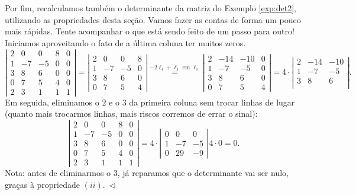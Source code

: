 \begin{ex}
Por fim, recalculamos também o determinante da matriz do Exemplo \ref{exp:det2}, utilizando as propriedades desta seção. Vamos fazer as contas de forma um pouco mais rápidas. Tente acompanhar o que está sendo feito de um passo para outro! Iniciamos aproveitando o fato de a última coluna ter muitos zeros.
\begin{equation}
\left|
\begin{matrix}
2 & 0 & 0 & 8 & 0 \\
1 & -7 & -5 & 0 & 0 \\
3 & 8 & 6 & 0 & 0 \\
0 & 7 & 5 & 4 & 0 \\
2 & 3 & 1 & 1 & 1
\end{matrix}
\right| =
\left|
\begin{matrix}
2 & 0 & 0 & 8 \\
1 & -7 & -5 & 0  \\
3 & 8 & 6 & 0  \\
0 & 7 & 5 & 4
\end{matrix}
\right| \stackrel{-2\ell_4 + \ell_1 \text{ em } \ell_1}{=}
\left|
\begin{matrix}
2 & -14 & -10 & 0 \\
1 & -7 & -5 & 0  \\
3 & 8 & 6 & 0  \\
0 & 7 & 5 & 4
\end{matrix}
\right| =  4 \cdot
\left|
\begin{matrix}
2 & -14 & -10  \\
1 & -7 & -5  \\
3 & 8 & 6   \\
\end{matrix}
\right|.
\end{equation} Em seguida, eliminamos o $2$ e o $3$ da primeira coluna sem trocar linhas de lugar (quanto mais trocarmos linhas, mais riscos corremos de errar o sinal):
\begin{equation}
\left|
\begin{matrix}
2 & 0 & 0 & 8 & 0 \\
1 & -7 & -5 & 0 & 0 \\
3 & 8 & 6 & 0 & 0 \\
0 & 7 & 5 & 4 & 0 \\
2 & 3 & 1 & 1 & 1
\end{matrix}
\right| = 4 \cdot
\left|
\begin{matrix}
0 &  0 &  0  \\
1 & -7 & -5  \\
0 & 29 & -9
\end{matrix}
\right| 4 \cdot 0 = 0.
\end{equation} Nota: antes de eliminarmos o $3$, já reparamos que o determinante vai ser nulo, graças à propriedade $(ii). \ \lhd$
\end{ex}

